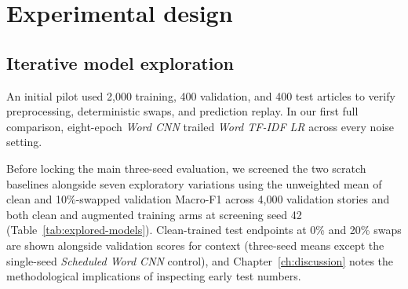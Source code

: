 \chapter{Experimental design}\label{ch:experiments}

\section{Iterative model exploration}
An initial pilot used 2,000 training, 400 validation, and 400 test articles to verify preprocessing, deterministic swaps, and prediction replay. In our first full comparison, eight-epoch \textit{Word CNN} trailed \textit{Word TF-IDF LR} across every noise setting.

Before locking the main three-seed evaluation, we screened the two scratch baselines alongside seven exploratory variations using the unweighted mean of clean and 10\%-swapped validation Macro-F1 across 4,000 validation stories and both clean and augmented training arms at screening seed 42 (Table~\ref{tab:explored-models}). Clean-trained test endpoints at 0\% and 20\% swaps are shown alongside validation scores for context (three-seed means except the single-seed \textit{Scheduled Word CNN} control), and Chapter~\ref{ch:discussion} notes the methodological implications of inspecting early test numbers.

